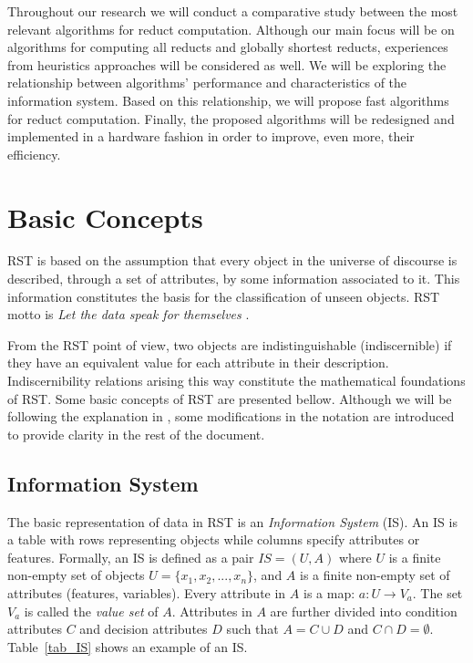 \documentclass[authoryear,11pt]{elsarticle}
\begin{document}
  Throughout our research we will conduct a comparative study between the most relevant algorithms for reduct 
  computation. Although our main focus will be on algorithms for computing all reducts and globally shortest
  reducts, experiences from heuristics approaches will be considered as well. We will be exploring the relationship 
  between algorithms' performance and characteristics of the information system. Based on this relationship,
  we will propose fast algorithms for reduct computation. Finally, the proposed algorithms 
  will be redesigned and implemented in a hardware fashion in order to improve, even more, their efficiency.  

\section{Basic Concepts}\label{basicConcepts}
  RST is based on the assumption that every object in the universe of discourse is described, through a 
  set of attributes, by some information associated to it. This information constitutes the basis for the
  classification of unseen objects. RST motto is \textit{Let the data speak for themselves} \citep{Tiwari14}.
  
  From the RST point of view, two objects are indistinguishable (indiscernible) if they have an equivalent 
  value for each attribute in their description. Indiscernibility relations arising this way constitute the
  mathematical foundations of RST. 
  Some basic concepts of RST are presented bellow. Although we will be following the explanation 
  in \citep{Polkowski00}, some modifications in the notation are introduced to provide clarity in the rest 
  of the document.
  
\subsection{Information System}
  The basic representation of data in RST is an \emph{Information System} (IS). An IS is a table with rows
  representing objects while columns specify attributes or features. Formally, an IS is defined as a pair
  $IS=(U,A)$ where $U$ is a finite non-empty set of objects $U=\lbrace x_1,x_2,...,x_n\rbrace$, and $A$ is a 
  finite non-empty set
  of attributes (features, variables). Every attribute in $A$ is a map: $a: U \rightarrow V_a$. The set $V_a$ is
  called the \textit{value set} of $A$. Attributes in $A$ are further divided into condition attributes $C$ and 
  decision attributes $D$ such that $A=C \cup D$ and $C \cap D =\emptyset$. 
  Table~\ref{tab_IS} shows an example of an IS.
  
\end{document}
